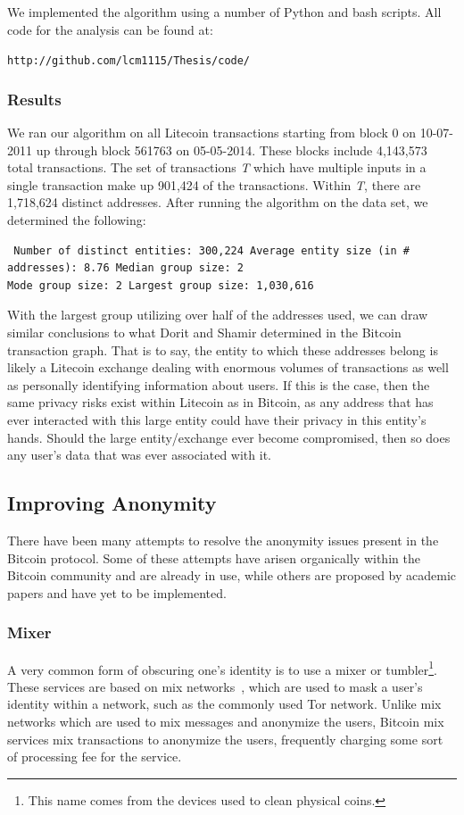\documentclass[11pt]{article}
\begin{document}
We implemented the algorithm using a number of Python and bash scripts. All code for the analysis can be found at:
\begin{center} \texttt{http://github.com/lcm1115/Thesis/code/} \end{center}

\subsubsection{Results} We ran our algorithm on all Litecoin transactions starting from block 0 on 10-07-2011 up through
block 561763 on 05-05-2014. These blocks include 4,143,573 total transactions. The set of transactions \emph{T} which
have multiple inputs in a single transaction make up 901,424 of the transactions. Within \emph{T}, there are 1,718,624
distinct addresses. After running the algorithm on the data set, we determined the following: \pagebreak
\begin{verbatim} Number of distinct entities: 300,224 Average entity size (in # addresses): 8.76 Median group size: 2
Mode group size: 2 Largest group size: 1,030,616 \end{verbatim}

With the largest group utilizing over half of the addresses used, we can draw similar conclusions to what Dorit and
Shamir determined in the Bitcoin transaction graph. That is to say, the entity to which these addresses belong is likely
a Litecoin exchange dealing with enormous volumes of transactions as well as personally identifying information about
users\cite{ron13}. If this is the case, then the same privacy risks exist within Litecoin as in Bitcoin, as any address
that has ever interacted with this large entity could have their privacy in this entity's hands.  Should the large
entity/exchange ever become compromised, then so does any user's data that was ever associated with it.

\subsection{Improving Anonymity} There have been many attempts to resolve the anonymity issues present in the Bitcoin
protocol. Some of these attempts have arisen organically within the Bitcoin community and are already in use, while
others are proposed by academic papers and have yet to be implemented.

\subsubsection{Mixer} A very common form of obscuring one's identity is to use a mixer or tumbler\footnote{This name
comes from the devices used to clean physical coins.}.  These services are based on mix networks~\cite{chaum81}, which
are used to mask a user's identity within a network, such as the commonly used Tor network.  Unlike mix networks which
are used to mix messages and anonymize the users, Bitcoin mix services mix transactions to anonymize the users,
frequently charging some sort of processing fee for the service.
\end{document}
